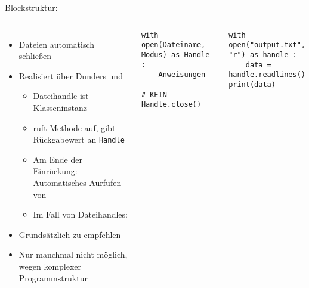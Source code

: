 \begin{frame}[fragile]{Blockstruktur: }
%
\begin{columns}[T]
\begin{itemize}
\item Dateien automatisch schließen
\item Realisiert über Dunders  und 
	\begin{itemize}
	\item Dateihandle ist Klasseninstanz
	\item {} ruft Methode  auf, gibt Rückgabewert an \texttt{Handle}
	\item Am Ende der Einrückung: Automatisches Aurfufen von 
	\item Im Fall von Dateihandles: 
	\end{itemize}
\item Grundsätzlich zu empfehlen
\item Nur manchmal nicht möglich, wegen komplexer Programmstruktur
\end{itemize}
%
\begin{codebox}
\begin{verbatim}
with open(Dateiname, Modus) as Handle :
    Anweisungen

# KEIN Handle.close()
\end{verbatim}
\end{codebox}
%
\begin{codebox}
\begin{verbatim}
with open("output.txt", "r") as handle :
    data = handle.readlines()
print(data)
\end{verbatim}
\end{codebox}
%
\end{columns}
%
\end{frame}


